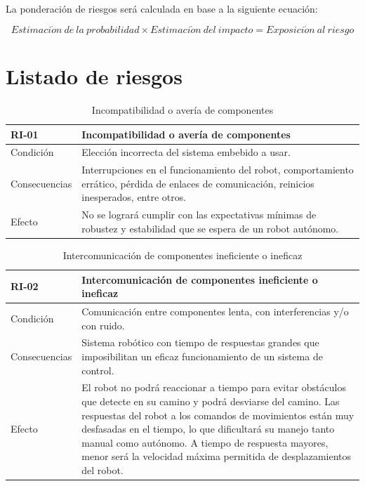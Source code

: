 La ponderación de riesgos será calculada en base a la siguiente ecuación:

\begin{equation}
    Estimaci\acute{o}n\ de\ la\ probabilidad \times Estimaci\acute{o}n\ del\ impacto = Exposici\acute{o}n\ al\ riesgo
\end{equation}

\section{Listado de riesgos}

\begin{table}[H]
\centering
\begin{tabular} {|m{2.5cm}|m{11.5cm}|}
    \hline \rowcolor{test_header_color}
    RI-01 & Incompatibilidad o avería de componentes \\
    \hline
        Condición & Elección incorrecta del sistema embebido a usar. \\
    \hline
        Consecuencias & Interrupciones en el funcionamiento del robot, comportamiento errático, pérdida de enlaces de comunicación, reinicios inesperados, entre otros. \\
    \hline
        Efecto & No se logrará cumplir con las expectativas mínimas de robustez y estabilidad que se espera de un robot autónomo. \\
    \hline
\end{tabular}
\label{}
\caption{Incompatibilidad o avería de componentes}
\end{table}

\begin{table}[H]
\centering
\begin{tabular} {|m{2.5cm}|m{11.5cm}|}
    \hline \rowcolor{test_header_color}
    RI-02 & Intercomunicación de componentes ineficiente o ineficaz \\
    \hline
        Condición & Comunicación entre componentes lenta, con interferencias y/o con ruido. \\
    \hline
        Consecuencias & Sistema robótico con tiempo de respuestas grandes que imposibilitan un eficaz funcionamiento de un sistema de control. \\
    \hline
        Efecto & El robot no podrá reaccionar a tiempo para evitar obstáculos que detecte en su camino y podrá desviarse del camino. Las respuestas del robot a los comandos de movimientos están muy desfasadas en el tiempo, lo que dificultará su manejo tanto manual como autónomo. A tiempo de respuesta mayores, menor será la velocidad máxima permitida de desplazamientos del robot. \\
    \hline
    \end{tabular}
\caption{Intercomunicación de componentes ineficiente o ineficaz}
\end{table}

